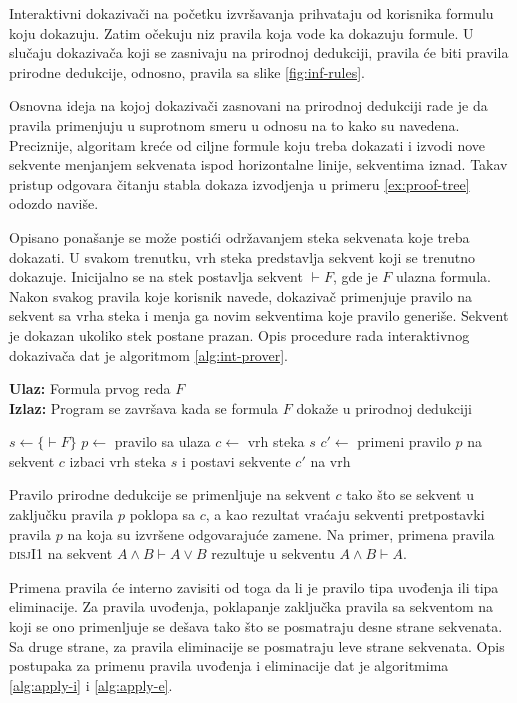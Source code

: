 \documentclass[a4paper,10pt]{article}
\theoremstyle{remark}
\newenvironment{serbianalgorithm}[1][]
  {\begin{algorithm}[#1]
     \selectlanguage{serbian}%
     \floatname{algorithm}{Algoritam}%
     \renewcommand{\algorithmicif}{\textbf{ako}}
     \renewcommand{\algorithmicthen}{\textbf{onda}}
     \renewcommand{\algorithmicelse}{\textbf{inače}}
     \renewcommand{\algorithmicend}{\textbf{kraj}}
     \renewcommand{\algorithmicfor}{\textbf{za}}
     \renewcommand{\algorithmicwhile}{\textbf{dok}}
     \renewcommand{\algorithmicforall}{\textbf{za sve}}
     \renewcommand{\algorithmicdo}{\textbf{radi}}
     \renewcommand{\algorithmicfunction}{\textbf{funkcija}}
     \renewcommand{\algorithmicend}{\textbf{kraj}}
     \renewcommand{\algorithmicreturn}{\textbf{vrati}}
  }
  {\end{algorithm}}
\begin{document}
Interaktivni dokazivači na početku izvršavanja prihvataju od korisnika formulu
koju dokazuju.
Zatim očekuju niz pravila koja vode ka dokazuju formule.
U slučaju dokazivača koji se zasnivaju na prirodnoj dedukciji, pravila će biti
pravila prirodne dedukcije, odnosno, pravila sa slike \ref{fig:inf-rules}.

Osnovna ideja na kojoj dokazivači zasnovani na prirodnoj dedukciji rade je da
pravila primenjuju u suprotnom smeru u odnosu na to kako su navedena.
Preciznije, algoritam kreće od ciljne formule koju treba dokazati i izvodi
nove sekvente menjanjem sekvenata ispod horizontalne linije, sekventima
iznad.
Takav pristup odgovara čitanju stabla dokaza izvodjenja u primeru
\ref{ex:proof-tree} odozdo naviše.

Opisano ponašanje se može postići održavanjem steka sekvenata koje treba
dokazati.
U svakom trenutku, vrh steka predstavlja sekvent koji se trenutno dokazuje.
Inicijalno se na stek postavlja sekvent $\vdash F$, gde je $F$ ulazna formula.
Nakon svakog pravila koje korisnik navede, dokazivač primenjuje pravilo na
sekvent sa vrha steka i menja ga novim sekventima koje pravilo generiše.
Sekvent je dokazan ukoliko stek postane prazan.
Opis procedure rada interaktivnog dokazivača dat je
algoritmom \ref{alg:int-prover}.

\begin{serbianalgorithm}[H]
    \caption{Interaktivni dokazivač}
    \label{alg:int-prover}
    \textbf{Ulaz:} Formula prvog reda $F$ \\
    \textbf{Izlaz:} Program se završava kada se formula $F$ dokaže u prirodnoj
    dedukciji
    \begin{algorithmic}[1]
        \State $s \gets \{ \vdash F \}$
            \State $p \gets$ pravilo sa ulaza
            \State $c \gets$ vrh steka $s$
            \State $c' \gets$ primeni pravilo $p$ na sekvent $c$
            \State izbaci vrh steka $s$ i postavi sekvente $c'$ na vrh
        \EndWhile
    \end{algorithmic}
\end{serbianalgorithm}

Pravilo prirodne dedukcije se primenljuje na sekvent $c$ tako što se sekvent u
zaključku pravila $p$ poklopa sa $c$, a kao rezultat vraćaju sekventi
pretpostavki pravila $p$ na koja su izvršene odgovarajuće zamene.
Na primer, primena pravila \textsc{disjI1} na sekvent
$A \land B \vdash A \lor B$ rezultuje u sekventu $A \land B \vdash A$.

Primena pravila će interno zavisiti od toga da li je pravilo tipa uvođenja
ili tipa eliminacije.
Za pravila uvođenja, poklapanje zaključka pravila sa sekventom na koji se ono
primenljuje se dešava tako što se posmatraju desne strane sekvenata.
Sa druge strane, za pravila eliminacije se posmatraju leve strane sekvenata.
Opis postupaka za primenu pravila uvođenja i eliminacije dat je algoritmima
\ref{alg:apply-i} i \ref{alg:apply-e}.
\end{document}
